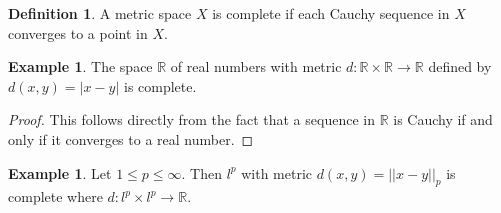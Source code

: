 \documentclass[11pt,a4paper]{article}
\theoremstyle{definition}
\newtheorem{defn}[thm]{Definition}
\newtheorem{exa}[thm]{Example}
\begin{document}
\begin{defn}
A metric space $X$ is complete if each Cauchy sequence in $X$ converges to a point in $X$.

\end{defn}


\begin{exa}
The space $\mathbb{R}$ of real numbers with metric $d:\mathbb{R}\times \mathbb{R}\rightarrow \mathbb{R}$ defined by $d(x,y)=|x-y|$ is complete.

\end{exa}


\begin{proof}
This follows directly from the fact that a sequence in $\mathbb{R}$ is Cauchy if and only if it converges to a real number.

\end{proof}


\begin{exa}
Let $1\leq p\leq \infty$. Then $l^p$ with metric $d(x,y)=||x-y||_p$ is complete where $d:l^p\times l^p\rightarrow \mathbb{R}$.

\end{exa}
\end{document}

